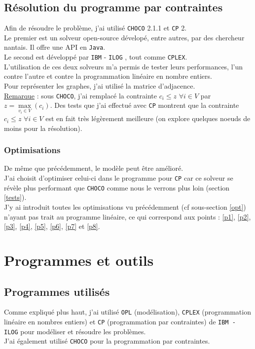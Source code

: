\subsection{Résolution du programme par contraintes}
Afin de résoudre le problème, j'ai utilisé \verb?CHOCO? 2.1.1 \cite{choco}
et \verb?CP? 2.\\
Le premier est un solveur open-source dévelopé, entre autres, par des chercheur nantais.
Il offre une API en \verb?Java?.\\
Le second est développé par \verb?IBM? - \verb?ILOG? \cite{ibm}, tout comme \verb?CPLEX?.\\

L'utilisation de ces deux solveurs m'a permis de tester leurs performances, l'un contre l'autre
et contre la programmation linéaire en nombre entiers.\\

Pour représenter les graphes, j'ai utilisé la matrice d'adjacence.\\

\underline{Remarque} : sous \verb?CHOCO?, j'ai remplacé la contrainte $c_i \leq z$ $\forall i \in V$
 par $z = \underset{v_i\in V}{\max} (c_i)$.
Des tests que j'ai effectué avec \verb?CP? montrent que la contrainte $c_i \leq z$ $\forall i \in V$
est en fait très légèrement meilleure (on explore quelques noeuds de moins pour la résolution).

\subsubsection{Optimisations}
De même que précédemment, le modèle peut être amélioré.\\
J'ai choisit d'optimiser celui-ci dans le programme pour \verb?CP? car ce solveur se révèle plus
performant que \verb?CHOCO? comme nous le verrons plus loin (section \ref{tests}).\\

J'y ai introduit toutes les optimisations vu précédemment (cf sous-section \ref{opt})
n'ayant pas trait au programme linéaire, ce qui correspond aux points : \ref{p1},
\ref{p2}, \ref{p3}, \ref{p4}, \ref{p5}, \ref{p6}, \ref{p7} et \ref{p8}.

\section{Programmes et outils}
\subsection{Programmes utilisés}
Comme expliqué plus haut, j'ai utilisé \verb?OPL? (modélisation), \verb?CPLEX? (programmation linéaire en nombres entiers)
et \verb?CP? (programmation par contraintes)
de \verb?IBM - ILOG? \cite{ibm} pour modéliser et
résoudre les problèmes.\\
J'ai également utilisé \verb?CHOCO? \cite{choco} pour la programmation par contraintes.\\

